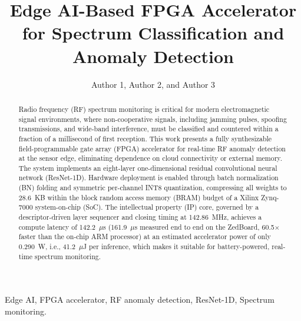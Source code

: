 \documentclass[conference]{IEEEtran}
\begin{document}
\title{Edge AI-Based FPGA Accelerator for Spectrum Classification and Anomaly Detection}

\author{Author 1, Author 2, and Author 3
  }
\maketitle


\begin{abstract}
Radio frequency (RF) spectrum monitoring is critical for modern electromagnetic signal environments, where non-cooperative signals, including jamming pulses, spoofing transmissions, and wide-band interference, must be classified and countered within a fraction of a millisecond of first reception. This work presents a fully synthesizable field-programmable gate array (FPGA) accelerator for real-time RF anomaly detection at the sensor edge, eliminating dependence on cloud connectivity or external memory. The system implements an eight-layer one-dimensional residual convolutional neural network (ResNet-1D).
Hardware deployment is enabled through batch normalization (BN) folding and symmetric per-channel INT8 quantization, compressing all weights to 28.6~KB within the block random access memory (BRAM) budget of a Xilinx Zynq-7000 system-on-chip (SoC). The intellectual property (IP) core, governed by a descriptor-driven layer sequencer and closing timing at 142.86~MHz, achieves a compute latency of 142.2~$\mu$s (161.9~$\mu$s measured end to end on the ZedBoard, 60.5$\times$ faster than the on-chip ARM processor) at an estimated accelerator power of only 0.290~W, i.e., 41.2~$\mu$J per inference, which makes it suitable for battery-powered, real-time spectrum monitoring.
\end{abstract}

\begin{IEEEkeywords}
Edge AI, FPGA accelerator, RF anomaly detection, ResNet-1D, Spectrum monitoring.
\end{IEEEkeywords}
\end{document}
